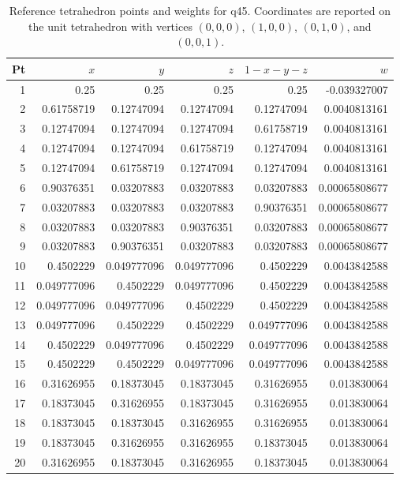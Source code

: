 \begin{table}[H]
\centering
\caption{Reference tetrahedron points and weights for q45. Coordinates are reported on the unit tetrahedron with vertices $(0,0,0)$, $(1,0,0)$, $(0,1,0)$, and $(0,0,1)$.}
\begin{tabular}{@{}rrrrrr@{}}
\toprule
Pt & $x$ & $y$ & $z$ & $1-x-y-z$ & $w$ \\
\midrule
1 & 0.25 & 0.25 & 0.25 & 0.25 & -0.039327007 \\
2 & 0.61758719 & 0.12747094 & 0.12747094 & 0.12747094 & 0.0040813161 \\
3 & 0.12747094 & 0.12747094 & 0.12747094 & 0.61758719 & 0.0040813161 \\
4 & 0.12747094 & 0.12747094 & 0.61758719 & 0.12747094 & 0.0040813161 \\
5 & 0.12747094 & 0.61758719 & 0.12747094 & 0.12747094 & 0.0040813161 \\
6 & 0.90376351 & 0.03207883 & 0.03207883 & 0.03207883 & 0.00065808677 \\
7 & 0.03207883 & 0.03207883 & 0.03207883 & 0.90376351 & 0.00065808677 \\
8 & 0.03207883 & 0.03207883 & 0.90376351 & 0.03207883 & 0.00065808677 \\
9 & 0.03207883 & 0.90376351 & 0.03207883 & 0.03207883 & 0.00065808677 \\
10 & 0.4502229 & 0.049777096 & 0.049777096 & 0.4502229 & 0.0043842588 \\
11 & 0.049777096 & 0.4502229 & 0.049777096 & 0.4502229 & 0.0043842588 \\
12 & 0.049777096 & 0.049777096 & 0.4502229 & 0.4502229 & 0.0043842588 \\
13 & 0.049777096 & 0.4502229 & 0.4502229 & 0.049777096 & 0.0043842588 \\
14 & 0.4502229 & 0.049777096 & 0.4502229 & 0.049777096 & 0.0043842588 \\
15 & 0.4502229 & 0.4502229 & 0.049777096 & 0.049777096 & 0.0043842588 \\
16 & 0.31626955 & 0.18373045 & 0.18373045 & 0.31626955 & 0.013830064 \\
17 & 0.18373045 & 0.31626955 & 0.18373045 & 0.31626955 & 0.013830064 \\
18 & 0.18373045 & 0.18373045 & 0.31626955 & 0.31626955 & 0.013830064 \\
19 & 0.18373045 & 0.31626955 & 0.31626955 & 0.18373045 & 0.013830064 \\
20 & 0.31626955 & 0.18373045 & 0.31626955 & 0.18373045 & 0.013830064 \\

\end{tabular}
\end{table}
